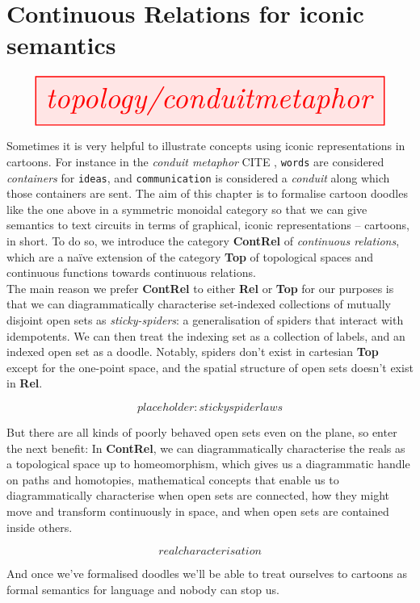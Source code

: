 \section{Continuous Relations for iconic semantics}




\[\resizebox{\textwidth}{!}{\tikzfig{topology/conduitmetaphor}}\]

Sometimes it is very helpful to illustrate concepts using iconic representations in cartoons. For instance in the \emph{conduit metaphor} \bR CITE \e, \texttt{words} are considered \emph{containers} for \texttt{ideas}, and \texttt{communication} is considered a \emph{conduit} along which those containers are sent. The aim of this chapter is to formalise cartoon doodles like the one above in a symmetric monoidal category so that we can give semantics to text circuits in terms of graphical, iconic representations -- cartoons, in short. To do so, we introduce the category \textbf{ContRel} of \emph{continuous relations}, which are a na\"{i}ve extension of the category \textbf{Top} of topological spaces and continuous functions towards continuous relations.\\

The main reason we prefer \textbf{ContRel} to either \textbf{Rel} or \textbf{Top} for our purposes is that we can diagrammatically characterise set-indexed collections of mutually disjoint open sets as \emph{sticky-spiders}: a generalisation of spiders that interact with idempotents. We can then treat the indexing set as a collection of labels, and an indexed open set as a doodle. Notably, spiders don't exist in cartesian \textbf{Top} except for the one-point space, and the spatial structure of open sets doesn't exist in \textbf{Rel}.

\[placeholder: stickyspider laws\]

But there are all kinds of poorly behaved open sets even on the plane, so enter the next benefit: In \textbf{ContRel}, we can diagrammatically characterise the reals as a topological space up to homeomorphism, which gives us a diagrammatic handle on paths and homotopies, mathematical concepts that enable us to diagrammatically characterise when open sets are connected, how they might move and transform continuously in space, and when open sets are contained inside others.

\[real characterisation\]

And once we've formalised doodles we'll be able to treat ourselves to cartoons as formal semantics for language and nobody can stop us.

